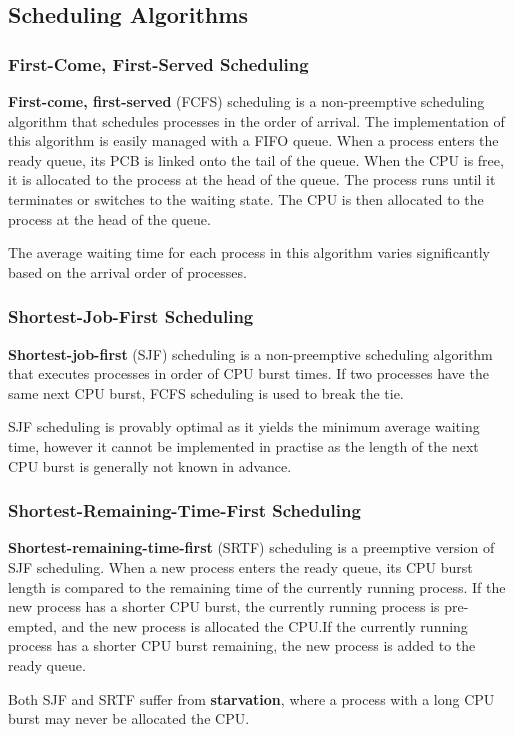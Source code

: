 \documentclass{article}
\begin{document}
\subsection{Scheduling Algorithms}
\subsubsection{First-Come, First-Served Scheduling}
\textbf{First-come, first-served} (FCFS) scheduling is a non-preemptive
scheduling algorithm that \linebreak schedules processes in the order of arrival.
The implementation of this algorithm is easily managed with a FIFO
queue. When a process enters the ready queue, its PCB is linked onto
the tail of the queue. When the CPU is free, it is allocated to the
process at the head of the queue. The process runs until it terminates
or switches to the waiting state. The CPU is then allocated to the
process at the head of the queue.

The average waiting time for each process in this algorithm varies
significantly based on the arrival order of processes.
\subsubsection{Shortest-Job-First Scheduling}
\textbf{Shortest-job-first} (SJF) scheduling is a non-preemptive
scheduling algorithm that executes processes in order of CPU burst
times. If two processes have the same next CPU burst, FCFS scheduling is
used to break the tie.

SJF scheduling is provably optimal as it yields the minimum average
waiting time, however it cannot be implemented in practise as the
length of the next CPU burst is generally not known in advance.
\subsubsection{Shortest-Remaining-Time-First Scheduling}
\textbf{Shortest-remaining-time-first} (SRTF) scheduling is a preemptive
version of SJF scheduling. When a new process enters the ready queue,
its CPU burst length is compared to the remaining time of the currently
running process. If the new process has a shorter CPU burst, the
currently running process is pre-empted, and the new process is
allocated the CPU.\@ If the currently running process has a shorter CPU
burst remaining, the new process is added to the ready queue.

Both SJF and SRTF suffer from \textbf{starvation}, where a process with
a long CPU burst may never be allocated the CPU.\@
\end{document}
